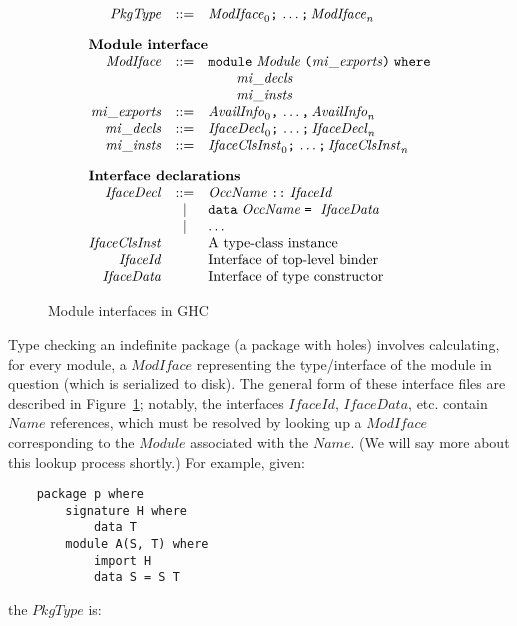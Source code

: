 \documentclass{article}
\newcommand{\I}[1]{\ensuremath{\mathit{#1}}}
\begin{document}
\begin{figure}[htpb]
$$
\begin{array}{rcll}
\I{PkgType} & ::= & \I{ModIface}_0 \verb|;|\, \ldots\verb|;|\, \I{ModIface}_n \\[1em]
\multicolumn{3}{l}{\mbox{\bf Module interface}} \\
\I{ModIface} & ::= & \verb|module| \; \I{Module} \; \verb|(| \I{mi\_exports} \verb|)| \; \verb|where| \\
& & \qquad \I{mi\_decls} \\
& & \qquad \I{mi\_insts} \\
\I{mi\_exports} & ::= & \I{AvailInfo}_0 \verb|,|\, \ldots \verb|,|\, \I{AvailInfo}_n \\
\I{mi\_decls} & ::= & \I{IfaceDecl}_0 \verb|;|\, \ldots \verb|;|\, \I{IfaceDecl}_n \\
\I{mi\_insts} & ::= & \I{IfaceClsInst}_0 \verb|;|\, \ldots \verb|;|\, \I{IfaceClsInst}_n \\[1em]
\multicolumn{3}{l}{\mbox{\bf Interface declarations}} \\
\I{IfaceDecl} & ::= & \I{OccName} \; \verb|::| \; \I{IfaceId} \\
              & |   & \verb|data| \; \I{OccName} \; \verb|=| \;\ \I{IfaceData} \\
              & |   & \ldots \\
\I{IfaceClsInst} & & \mbox{A type-class instance} \\
\I{IfaceId} & & \mbox{Interface of top-level binder} \\
\I{IfaceData} & & \mbox{Interface of type constructor} \\
\end{array}
$$
\caption{Module interfaces in GHC} \label{fig:typecheck}
\end{figure}

Type checking an indefinite package (a package with holes) involves
calculating, for every module, a \I{ModIface} representing the
type/interface of the module in question (which is serialized
to disk).  The general form of these
interface files are described in Figure~\ref{fig:typecheck}; notably,
the interfaces \I{IfaceId}, \I{IfaceData}, etc. contain \I{Name} references,
which must be resolved by
looking up a \I{ModIface} corresponding to the \I{Module} associated
with the \I{Name}. (We will say more about this lookup process shortly.)
For example, given:

\begin{verbatim}
    package p where
        signature H where
            data T
        module A(S, T) where
            import H
            data S = S T
\end{verbatim}
%
the \I{PkgType} is:
\end{document}
